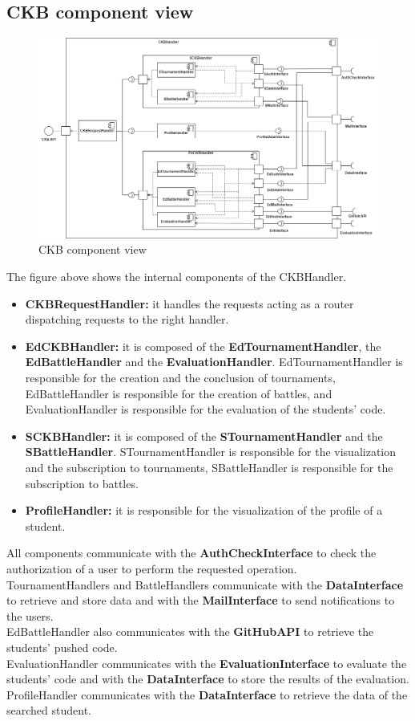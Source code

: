 \subsection{CKB component view}
\begin{figure}[H]
    \centering
    \includegraphics[width=\textwidth]{images/component_view/ckb_handler.png}
    \caption{CKB component view}
\end{figure}
The figure above shows the internal components of the CKBHandler.
\begin{itemize}
    \item \textbf{CKBRequestHandler: } it handles the requests acting as a router dispatching requests to the right handler.
    \item \textbf{EdCKBHandler: } it is composed of the \textbf{EdTournamentHandler}, the \textbf{EdBattleHandler} and the \textbf{EvaluationHandler}.
    EdTournamentHandler is responsible for the creation and the conclusion of tournaments, EdBattleHandler is responsible for the creation of battles, and 
    EvaluationHandler is responsible for the evaluation of the students' code.
    \item \textbf{SCKBHandler: } it is composed of the \textbf{STournamentHandler} and the \textbf{SBattleHandler}. STournamentHandler is responsible for the 
    visualization and the subscription to tournaments, SBattleHandler is responsible for the subscription to battles.
    \item \textbf{ProfileHandler: } it is responsible for the visualization of the profile of a student. 
\end{itemize}
All components communicate with the \textbf{AuthCheckInterface} to check the authorization of a user to perform the requested operation.\\
TournamentHandlers and BattleHandlers communicate with the \textbf{DataInterface} to retrieve and store data and with the \textbf{MailInterface} to send notifications to the users.\\
EdBattleHandler also communicates with the \textbf{GitHubAPI} to retrieve the students' pushed code.\\
EvaluationHandler communicates with the \textbf{EvaluationInterface} to evaluate the students' code and with the \textbf{DataInterface} to store the results of the evaluation.\\
ProfileHandler communicates with the \textbf{DataInterface} to retrieve the data of the searched student.



